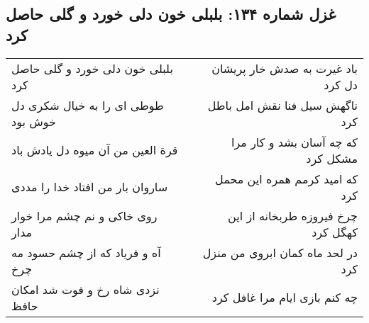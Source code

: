 \begin{center}
\section*{غزل شماره ۱۳۴: بلبلی خون دلی خورد و گلی حاصل کرد}
\label{sec:sh134}
\begin{longtable}{l p{0.5cm} r}
بلبلی خون دلی خورد و گلی حاصل کرد
&&
باد غیرت به صدش خار پریشان دل کرد
\\
طوطی ای را به خیال شکری دل خوش بود
&&
ناگهش سیل فنا نقش امل باطل کرد
\\
قرة العین من آن میوه دل یادش باد
&&
که چه آسان بشد و کار مرا مشکل کرد
\\
ساروان بار من افتاد خدا را مددی
&&
که امید کرمم همره این محمل کرد
\\
روی خاکی و نم چشم مرا خوار مدار
&&
چرخ فیروزه طربخانه از این کهگل کرد
\\
آه و فریاد که از چشم حسود مه چرخ
&&
در لحد ماه کمان ابروی من منزل کرد
\\
نزدی شاه رخ و فوت شد امکان حافظ
&&
چه کنم بازی ایام مرا غافل کرد
\\
\end{longtable}
\end{center}
